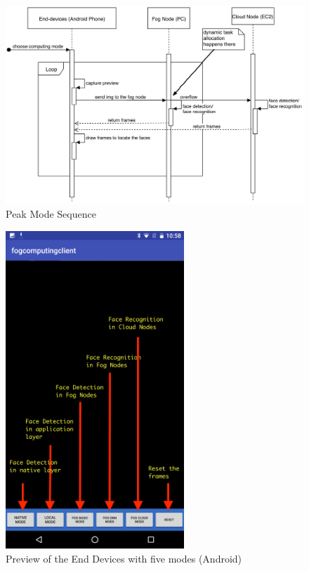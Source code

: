 \begin{figure}
    \centering
    \includegraphics[width=\textwidth]{images/cloud_mode.png}
    \caption{Peak Mode Sequence}
    \label{fig:peak_mode_sequence}
\end{figure}


\begin{figure}
    \centering    \includegraphics[width=0.6\textwidth]{images/preview.png}
    \caption{Preview of the End Devices with five modes (Android)}
    \label{fig:preview}
\end{figure}

